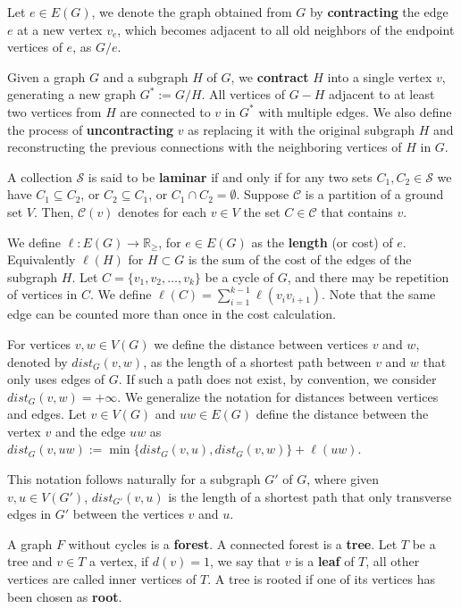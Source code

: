 Let \(e \in E(G)\), we denote the graph obtained from \(G\) by \textbf{contracting} the edge \(e\) at a new vertex \(v_e\), which becomes adjacent to all old neighbors of the endpoint vertices of \(e\), as \(G / e\).

Given a graph \(G\) and a subgraph \(H\) of \(G\), we \textbf{contract} \(H\) into a single vertex \(v\), generating a new graph \(G^\ast := G / H\). All vertices of \(G - H\) adjacent to at least two vertices from \(H\) are connected to \(v\) in \(G^\ast\) with multiple edges. We also define the process of \textbf{uncontracting} \(v\) as replacing it with the original subgraph \(H\) and reconstructing the previous connections with the neighboring vertices of \(H\) in \(G\).

A collection \(\mathcal{S}\) is said to be \textbf{laminar} if and only if for any two sets \(C_1, C_2 \in \mathcal{S}\) we have \(C_1 \subseteq C_2\), or \(C_2 \subseteq C_1\), or \(C_1 \cap C_2 = \emptyset\). Suppose \(\mathcal{C}\) is a partition of a ground set \(V\). Then, \(\mathcal{C}(v)\) denotes for each \(v \in V\) the set \(C \in \mathcal{C}\) that contains \(v\).

We define \(\ell \colon E(G) \to \mathbb{R}_\ge\), for \(e \in E(G)\) as the \textbf{length} (or cost) of \(e\). Equivalently \(\ell(H)\) for \(H \subset G\) is the sum of the cost of the edges of the subgraph \(H\). Let \(C = \{v_1, v_2, \dots, v_k\}\) be a cycle of \(G\), and there may be repetition of vertices in \(C\). We define \(\ell(C) = \sum_{i=1}^{k-1} \ell(v_i v_{i+1})\). Note that the same edge can be counted more than once in the cost calculation.

For vertices \(v, w \in V(G)\) we define the distance between vertices $v$ and $w$, denoted by \(dist_G(v, w)\), as the length of a shortest path between \(v\) and \(w\) that only uses edges of \(G\). If such a path does not exist, by convention, we consider \(dist_G(v, w) = +\infty\). We generalize the notation for distances between vertices and edges. Let \(v \in V(G)\) and \(uw \in E(G)\) define the distance between the vertex \(v\) and the edge \(uw\) as \(dist_G(v, uw) := \min\{dist_G(v, u), dist_G(v, w)\} + \ell(uw)\).

This notation follows naturally for a subgraph \(G'\) of \(G\), where given \(v, u \in V(G')\), \(dist_{G'}(v, u)\) is the length of a shortest path that only transverse edges in \(G'\) between the vertices \(v\) and \(u\).

A graph \(F\) without cycles is a \textbf{forest}. A connected forest is a \textbf{tree}. Let \(T\) be a tree and \(v \in T\) a vertex, if \(d(v) = 1\), we say that \(v\) is a \textbf{leaf} of \(T \), all other vertices are called inner vertices of \(T\). A tree is rooted if one of its vertices has been chosen as \textbf{root}.

